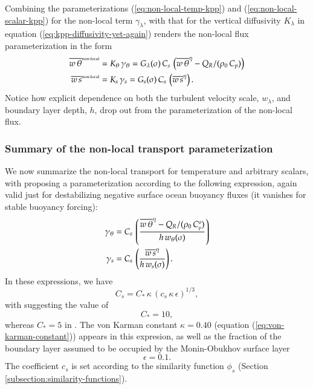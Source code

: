 \begin{itemize}
Combining the parameterizations (\ref{eq:non-local-temp-kpp}) and
(\ref{eq:non-local-scalar-kpp}) for the non-local term
$\gamma_{\lambda}$, with that for the vertical diffusivity
$K_{\lambda}$ in equation (\ref{eq:kpp-diffusivity-yet-again}) renders
the non-local flux parameterization in the form
\begin{align}
\overline{w \, \theta}^{\mbox{\tiny non-local}} &= K_{\theta}  \, \gamma_{\theta}
  = 
 G_{\lambda}(\sigma) \, C_{s} \, \left( \overline{w \, \theta}^{\eta} - Q_{R}/(\rho_{0} \, C_{p}) \right)
\label{eq:non-local-flux-kpp-param-temp}
\\
\overline{w \, s}^{\mbox{\tiny non-local}} &= K_{s}  \, \gamma_{s}
  = 
 G_{s}(\sigma) \, C_{s}\,\left( \overline{w \, s}^{\eta} \right).
\label{eq:non-local-flux-kpp-param-scalar}
\end{align}
Notice how explicit dependence on both the turbulent velocity scale,
$w_{\lambda}$, and boundary layer depth, $h$, drop out from the
parameterization of the non-local flux.

\end{itemize}



\subsubsection{Summary of the non-local transport parameterization} 

We now summarize the non-local transport for temperature and arbitrary
scalars, with \cite{LargeKPP} proposing a parameterization according
to the following expression, again valid just for destabilizing
negative surface ocean buoyancy fluxes (it vanishes for stable
buoyancy forcing):
\begin{align}
 \gamma_{\theta} &= 
   C_{s} \, \left( \frac{ \overline{w \, \theta}^{\eta} - Q_{R}/(\rho_{0} \, C_{\mbox{\tiny p}}^{o} )  }{h \,  w_{\theta}(\sigma)}  
            \right) 
\label{eq:non-local-temp-kpp-again}
\\
 \gamma_{s} &= 
   C_{s} \, \left( \frac{ \overline{w \, s}^{\eta} }{h \,  w_{s}(\sigma)}  
            \right).
\label{eq:non-local-scalar-kpp-again}
\end{align}
 In these expressions, we have 
\begin{equation}
 C_{s} = C_{*} \, \kappa \, (c_{s} \, \kappa \, \epsilon)^{1/3},  
\end{equation}
with \cite{LargeKPP} suggesting the value of 
\begin{equation}
 C_{*} = 10,
\end{equation}
whereas $C_{*} = 5$ in \cite{Smyth_etal2002}.  The von Karman constant
$\kappa = 0.40$ (equation (\ref{eq:von-karman-constant})) appears in
this expresion, as well as the fraction of the boundary layer assumed
to be occupied by the Monin-Obukhov surface layer
\begin{equation}
\epsilon = 0.1.
\end{equation}
The coefficient $c_{s}$ is set according to the similarity function
$\phi_{s}$ (Section \ref{subsection:similarity-functions}).

